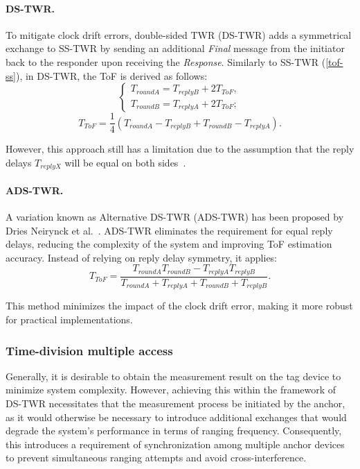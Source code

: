 \paragraph{DS-TWR.} 
To mitigate clock drift errors, double-sided TWR (DS-TWR) adds a symmetrical exchange to SS-TWR by sending an additional \emph{Final} message from the initiator back to the responder upon receiving the \emph{Response}. Similarly to SS-TWR (\autoref{tof-ss}), in DS-TWR, the ToF is derived as follows: 
\begin{equation}
\begin{cases}
T_{roundA} = T_{replyB} + 2T_{ToF},\\
T_{roundB} = T_{replyA} + 2T_{ToF};
\end{cases}
\end{equation}
\begin{equation}
T_{ToF} = \frac{1}{4} (T_{roundA} - T_{replyB} + T_{roundB} - T_{replyA}).
\end{equation}

However, this approach still has a limitation due to the assumption that the reply delays $T_{replyX}$ will be equal on both sides~\cite{neirynck2016alternative}. 

\paragraph{ADS-TWR.}\label{adstwr}
A variation known as Alternative DS-TWR (ADS-TWR) has been proposed by Dries Neirynck et al.~\cite{neirynck2016alternative}. ADS-TWR eliminates the requirement for equal reply delays, reducing the complexity of the system and improving ToF estimation accuracy. Instead of relying on reply delay symmetry, it applies:
\begin{equation}
T_{ToF} = \frac{T_{roundA}T_{roundB} - T_{replyA}T_{replyB}}{T_{roundA} + T_{replyA} + T_{roundB} + T_{replyB}}.
\end{equation}

This method minimizes the impact of the clock drift error, making it more robust for practical implementations.

\subsubsection{Time-division multiple access}\label{tdma}

Generally, it is desirable to obtain the measurement result on the tag device to minimize system complexity. However, achieving this within the framework of DS-TWR necessitates that the measurement process be initiated by the anchor, as it would otherwise be necessary to introduce additional exchanges that would degrade the system's performance in terms of ranging frequency. Consequently, this introduces a requirement of synchronization  among multiple anchor devices to prevent simultaneous ranging attempts and avoid cross-interference.

